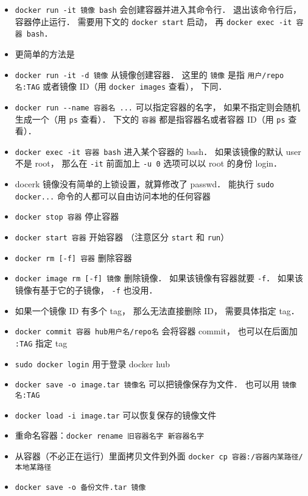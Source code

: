 \begin{itemize}
\item \verb|docker run -it 镜像 bash| 会创建容器并进入其命令行． 退出该命令行后， 容器停止运行． 需要用下文的 \verb|docker start| 启动， 再 \verb|docker exec -it 容器 bash|．
\item 更简单的方法是
\item \verb`docker run -it -d 镜像` 从镜像创建容器．  这里的 \verb|镜像| 是指 \verb|用户/repo名:TAG| 或者镜像 ID（用 \verb|docker images| 查看）， 下同．
\item \verb|docker run --name 容器名 ...| 可以指定容器的名字， 如果不指定则会随机生成一个（用 \verb|ps| 查看）． 下文的 \verb|容器| 都是指容器名或者容器 ID（用 \verb|ps| 查看）．
\item \verb`docker exec -it 容器 bash` 进入某个容器的 bash． 如果该镜像的默认 user 不是 root， 那么在 \verb|-it| 前面加上 \verb|-u 0| 选项可以以 root 的身份 login．
\item docerk 镜像没有简单的上锁设置，就算修改了 passwd． 能执行 \verb`sudo docker...` 命令的人都可以自由访问本地的任何容器
\item \verb`docker stop 容器` 停止容器
\item \verb`docker start 容器` 开始容器 （注意区分 \verb|start| 和 \verb|run|）
\item \verb`docker rm [-f] 容器` 删除容器
\item \verb`docker image rm [-f] 镜像` 删除镜像． 如果该镜像有容器就要 \verb|-f|． 如果该镜像有基于它的子镜像， \verb|-f| 也没用．
\item 如果一个镜像 ID 有多个 tag， 那么无法直接删除 ID， 需要具体指定 tag．
\item \verb`docker commit 容器 hub用户名/repo名` 会将容器 commit， 也可以在后面加 \verb`:TAG` 指定 tag
\item \verb`sudo docker login` 用于登录 docker hub
\item \verb|docker save -o image.tar 镜像名| 可以把镜像保存为文件． 也可以用 \verb|镜像名:TAG|
\item \verb|docker load -i image.tar| 可以恢复保存的镜像文件
\item 重命名容器：\verb|docker rename 旧容器名字 新容器名字|
\item 从容器（不必正在运行）里面拷贝文件到外面 \verb|docker cp 容器:/容器内某路径/ 本地某路径|
\item \verb|docker save -o 备份文件.tar 镜像|
\end{itemize}

